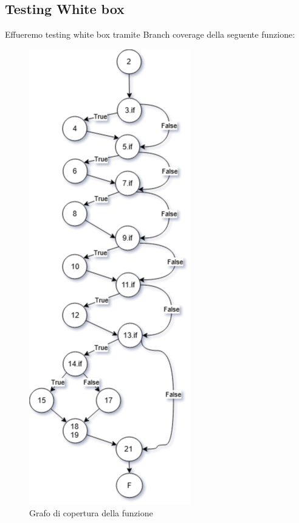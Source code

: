 \pagebreak
\subsection{Testing White box}
Effueremo testing white box tramite Branch coverage della seguente funzione:



\begin{center}
    \begin{figure}[h]
        \centering
        \caption{Grafo di copertura della funzione}
        \includegraphics[height=0.9\textheight]{Figures/Grafo di copertura.png}
    \end{figure}
\end{center}


